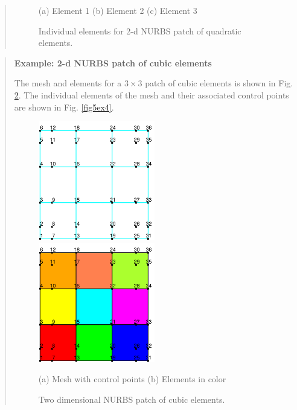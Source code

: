 \begin{quote}
\begin{figure}[!h]
\begin{center}
\centerline{(a) Element 1 \hspace{0.7in} (b) Element 2 \hspace{0.7in} (c) Element 3}

\caption{Individual elements for 2-d NURBS patch of quadratic elements.  \label{fig5ex2}}
\end{center}
\end{figure}

\end{quote}

\begin{quote}
\noindent
\textbf{Example: 2-d NURBS patch of cubic elements}

The mesh and elements for a $3 \times 3$ patch of cubic elements is
shown in Fig. \ref{fig5ex3}.  The individual elements of the mesh and
their associated control points are shown in Fig. \ref{fig5ex4}.

\begin{figure}[!t]
\begin{center}

\centerline{
\includegraphics[width=2.0in]{figs/mesh_3_mesh} \hspace{0.2in}
\includegraphics[width=2.0in]{figs/mesh_3_fill}
}

\centerline{(a) Mesh with control points \hspace{1in} (b) Elements in color}

\caption{Two dimensional NURBS patch of cubic elements.  \label{fig5ex3}}
\end{center}
\end{figure}


\end{quote}
